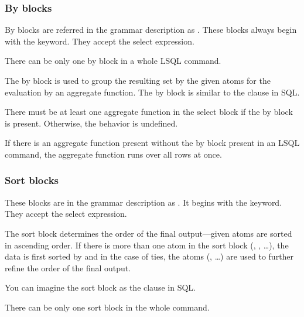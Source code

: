 \subsubsection{By blocks}
By blocks are referred in the grammar description as .
These blocks always begin with the  keyword. They accept the select expression. 

There can be only one by block in a whole LSQL command.

The by block is used to group the resulting set by the given atoms for the evaluation by an aggregate function.
The by block is similar to the  clause in SQL. 

There must be at least one aggregate function in the select block if the by block is present. Otherwise, the behavior is undefined.

If there is an aggregate function present without the by block present in an LSQL command, the aggregate function runs over all rows at once.

\subsubsection{Sort blocks}
These blocks are in the grammar description as .
It begins with the  keyword. They accept the select expression.

The sort block determines the order of the final output---given atoms are sorted in ascending order.
If there is more than one atom in the sort block (, , \ldots), the data is first sorted by  
and in the case of ties, the atoms (, \ldots) are used to further refine the order of the final output.

You can imagine the sort block as the  clause in SQL.

There can be only one sort block in the whole command.

